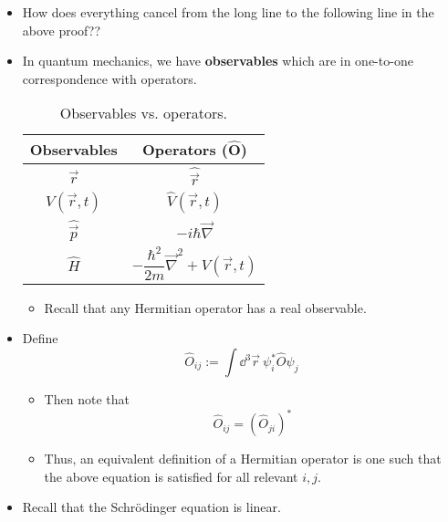 \documentclass[../notes.tex]{subfiles}
\begin{document}
\begin{itemize}
\begin{proof}
\begin{align*}
            ={}& \int\dd^3\vec{r}\ \psi^*(-\vec{\nabla}V(\vec{r},t))\psi\\
            ={}& \Exp{-\vec{\nabla}V(\vec{r},t)}
        \end{align*}
        as desired.
    \end{proof}
    \item How does everything cancel from the long line to the following line in the above proof??
    \item In quantum mechanics, we have \textbf{observables} which are in one-to-one correspondence with operators.
    \begin{table}[h!]
        \centering
        \small
        \renewcommand{\arraystretch}{1.4}
        \begin{tabular}{c|c}
            \textbf{Observables} & \textbf{Operators ($\bm{\hat{O}}$)}\\
            \hline
            $\vec{r}$ & $\hat{\vec{r}}$\\
            $V(\vec{r},t)$ & $\hat{V}(\vec{r},t)$\\
            $\hat{\vec{p}}$ & $-i\hbar\vec{\nabla}$\\
            $\hat{H}$ & $-\dfrac{\hbar^2}{2m}\vec{\nabla}^2+V(\vec{r},t)$\\
        \end{tabular}
        \caption{Observables vs. operators.}
        \label{tab:observablesOperators}
    \end{table}
    \begin{itemize}
        \item Recall that any Hermitian operator has a real observable.
    \end{itemize}
    \item Define
    \begin{equation*}
        \hat{O}_{ij} := \int\dd^3\vec{r}\ \psi_i^*\hat{O}\psi_j
    \end{equation*}
    \begin{itemize}
        \item Then note that
        \begin{equation*}
            \hat{O}_{ij} = (\hat{O}_{ji})^*
        \end{equation*}
        \item Thus, an equivalent definition of a Hermitian operator is one such that the above equation is satisfied for all relevant $i,j$.
    \end{itemize}
    \item Recall that the Schr\"{o}dinger equation is linear.

\end{itemize}
\end{document}
